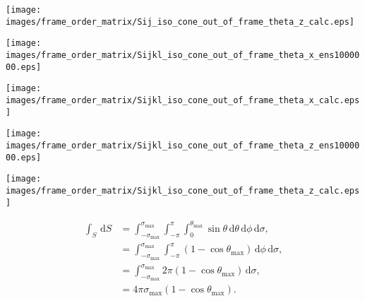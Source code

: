 \documentclass[a4paper,11pt,twoside,openright]{book}
\def\lthtmlcheckvsize{\ifdim\ht\sizebox<\vsize 
  \ifdim\wd\sizebox<\hsize\expandafter\hfill\fi \expandafter\vfill
  \else\expandafter\vss\fi}%
\begin{document}
{\newpage\clearpage
{}%
\texttt{[image: images/frame\_order\_matrix/Sij\_iso\_cone\_out\_of\_frame\_theta\_z\_calc.eps]}%
\lthtmlpictureZ
\lthtmlcheckvsize\clearpage}

{\newpage\clearpage
{}%
\texttt{[image: images/frame\_order\_matrix/Sijkl\_iso\_cone\_out\_of\_frame\_theta\_x\_ens1000000.eps]}%
\lthtmlpictureZ
\lthtmlcheckvsize\clearpage}

{\newpage\clearpage
{}%
\texttt{[image: images/frame\_order\_matrix/Sijkl\_iso\_cone\_out\_of\_frame\_theta\_x\_calc.eps]}%
\lthtmlpictureZ
\lthtmlcheckvsize\clearpage}

{\newpage\clearpage
{}%
\texttt{[image: images/frame\_order\_matrix/Sijkl\_iso\_cone\_out\_of\_frame\_theta\_z\_ens1000000.eps]}%
\lthtmlpictureZ
\lthtmlcheckvsize\clearpage}

{\newpage\clearpage
{}%
\texttt{[image: images/frame\_order\_matrix/Sijkl\_iso\_cone\_out\_of\_frame\_theta\_z\_calc.eps]}%
\lthtmlpictureZ
\lthtmlcheckvsize\clearpage}

{\newpage\clearpage
\setcounter{equation}{23}
%
\begin{subequations}\begin{align}
\int_S \,\mathrm{d}S &= \int_{-\sigma_{\textrm{max}}}^{\sigma_{\textrm{max}}} \int_{-\pi}^{\pi} \int_{0}^{\theta_{\textrm{max}}} \sin\theta \,\mathrm{d}\theta \,\mathrm{d}\phi \,\mathrm{d}\sigma , \\
&= \int_{-\sigma_{\textrm{max}}}^{\sigma_{\textrm{max}}} \int_{-\pi}^{\pi} \left( 1 - \cos\theta_{\textrm{max}}\right) \,\mathrm{d}\phi \,\mathrm{d}\sigma , \\
&= \int_{-\sigma_{\textrm{max}}}^{\sigma_{\textrm{max}}} 2\pi \left( 1 - \cos\theta_{\textrm{max}}\right) \,\mathrm{d}\sigma , \\
&= 4\pi \sigma_{\textrm{max}}\left( 1 - \cos\theta_{\textrm{max}}\right) .
\end{align}\end{subequations}%
\lthtmldisplayZ
\lthtmlcheckvsize\clearpage}
\end{document}
